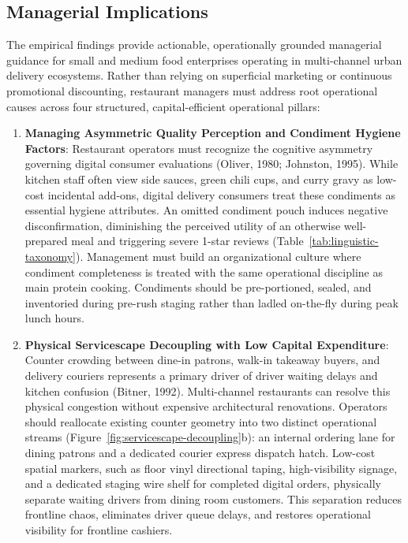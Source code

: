 \documentclass{jomas}
\begin{document}
\subsection{Managerial Implications}
The empirical findings provide actionable, operationally grounded managerial guidance for small and medium food enterprises operating in multi-channel urban delivery ecosystems. Rather than relying on superficial marketing or continuous promotional discounting, restaurant managers must address root operational causes across four structured, capital-efficient operational pillars:

\begin{enumerate}[leftmargin=*,label=\textbf{\arabic*.},itemsep=1pt,topsep=1pt]
    \item \textbf{Managing Asymmetric Quality Perception and Condiment Hygiene Factors}:
    Restaurant operators must recognize the cognitive asymmetry governing digital consumer evaluations (Oliver, 1980; Johnston, 1995). While kitchen staff often view side sauces, green chili cups, and curry gravy as low-cost incidental add-ons, digital delivery consumers treat these condiments as essential hygiene attributes. An omitted condiment pouch induces negative disconfirmation, diminishing the perceived utility of an otherwise well-prepared meal and triggering severe 1-star reviews (Table~\ref{tab:linguistic-taxonomy}). Management must build an organizational culture where condiment completeness is treated with the same operational discipline as main protein cooking. Condiments should be pre-portioned, sealed, and inventoried during pre-rush staging rather than ladled on-the-fly during peak lunch hours.

    \item \textbf{Physical Servicescape Decoupling with Low Capital Expenditure}:
    Counter crowding between dine-in patrons, walk-in takeaway buyers, and delivery couriers represents a primary driver of driver waiting delays and kitchen confusion (Bitner, 1992). Multi-channel restaurants can resolve this physical congestion without expensive architectural renovations. Operators should reallocate existing counter geometry into two distinct operational streams (Figure~\ref{fig:servicescape-decoupling}b): an internal ordering lane for dining patrons and a dedicated courier express dispatch hatch. Low-cost spatial markers, such as floor vinyl directional taping, high-visibility signage, and a dedicated staging wire shelf for completed digital orders, physically separate waiting drivers from dining room customers. This separation reduces frontline chaos, eliminates driver queue delays, and restores operational visibility for frontline cashiers.


\end{enumerate}
\end{document}
